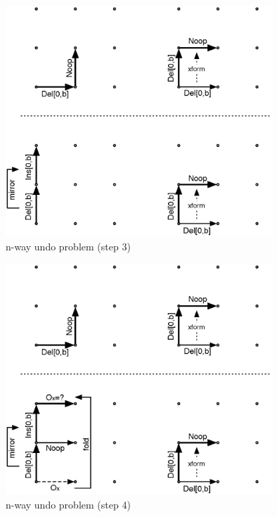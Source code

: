 \begin{figure}[H]
 \centering
 \includegraphics[width=10cm,height=8.69cm]{../../images/concepts_transformation-history-3.eps}
 \caption{n-way undo problem (step 3)}
 \label{fig:concepts.transformation-history-3}
\end{figure}

\begin{figure}[H]
 \centering
 \includegraphics[width=10cm,height=8.69cm]{../../images/concepts_transformation-history-4.eps}
 \caption{n-way undo problem (step 4)}
 \label{fig:concepts.transformation-history-4}
\end{figure}

